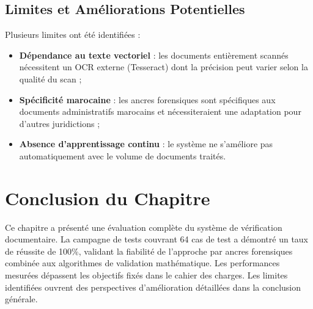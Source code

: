 \subsection{Limites et Am\'{e}liorations Potentielles}

Plusieurs limites ont \'{e}t\'{e} identifi\'{e}es :

\begin{itemize}[leftmargin=*, itemsep=4pt]
    \item \textbf{D\'{e}pendance au texte vectoriel} : les documents enti\`{e}rement scann\'{e}s n\'{e}cessitent un OCR externe (Tesseract) dont la pr\'{e}cision peut varier selon la qualit\'{e} du scan ;
    \item \textbf{Sp\'{e}cificit\'{e} marocaine} : les ancres forensiques sont sp\'{e}cifiques aux documents administratifs marocains et n\'{e}cessiteraient une adaptation pour d'autres juridictions ;
    \item \textbf{Absence d'apprentissage continu} : le syst\`{e}me ne s'am\'{e}liore pas automatiquement avec le volume de documents trait\'{e}s.
\end{itemize}

\section*{Conclusion du Chapitre}

Ce chapitre a pr\'{e}sent\'{e} une \'{e}valuation compl\`{e}te du syst\`{e}me de v\'{e}rification documentaire. La campagne de tests couvrant 64 cas de test a d\'{e}montr\'{e} un taux de r\'{e}ussite de 100\%, validant la fiabilit\'{e} de l'approche par ancres forensiques combin\'{e}e aux algorithmes de validation math\'{e}matique. Les performances mesur\'{e}es d\'{e}passent les objectifs fix\'{e}s dans le cahier des charges. Les limites identifi\'{e}es ouvrent des perspectives d'am\'{e}lioration d\'{e}taill\'{e}es dans la conclusion g\'{e}n\'{e}rale.
